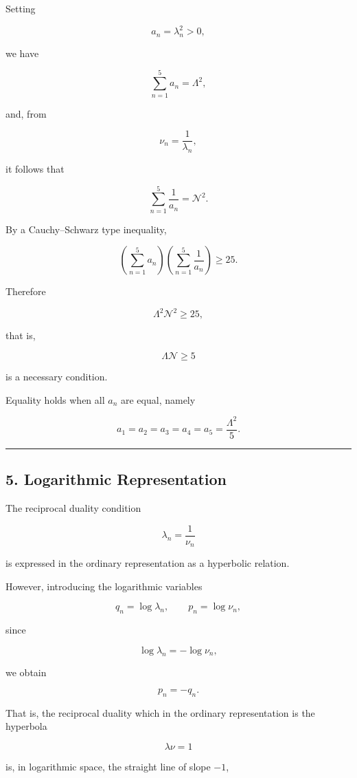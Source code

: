 \documentclass[
]{article}
\begin{document}
Setting

\[
a_n=\lambda_n^2>0 ,
\]

we have

\[
\sum_{n=1}^{5} a_n=\Lambda^2 ,
\]

and, from

\[
\nu_n=\frac{1}{\lambda_n} ,
\]

it follows that

\[
\sum_{n=1}^{5} \frac{1}{a_n}=\mathcal{N}^2 .
\]

By a Cauchy--Schwarz type inequality,

\[
\left(\sum_{n=1}^{5} a_n\right)
\left(\sum_{n=1}^{5} \frac{1}{a_n}\right)\ge 25 .
\]

Therefore

\[
\Lambda^2\mathcal{N}^2\ge 25 ,
\]

that is,

\[
\Lambda\mathcal{N}\ge 5
\]

is a necessary condition.

Equality holds when all \(a_n\) are equal, namely

\[
a_1=a_2=a_3=a_4=a_5=\frac{\Lambda^2}{5} .
\]

\begin{center}\rule{0.5\linewidth}{0.5pt}\end{center}

\subsection{5. Logarithmic
Representation}\label{logarithmic-representation}

The reciprocal duality condition

\[
\lambda_n=\frac{1}{\nu_n}
\]

is expressed in the ordinary representation as a hyperbolic relation.

However, introducing the logarithmic variables

\[
q_n=\log\lambda_n,\qquad
p_n=\log\nu_n ,
\]

since

\[
\log\lambda_n=-\log\nu_n ,
\]

we obtain

\[
p_n=-q_n .
\]

That is, the reciprocal duality which in the ordinary representation is
the hyperbola

\[
\lambda\nu=1
\]

is, in logarithmic space, the straight line of slope \(-1\),
\end{document}
